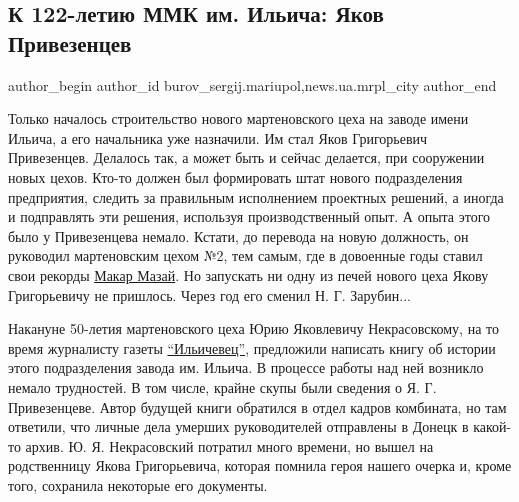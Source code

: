  
 
 
 
 
 
\subsection{К 122-летию ММК им. Ильича: Яков Привезенцев}
\label{sec:23_02_2019.stz.news.ua.mrpl_city.1.k_122_letiu_mmk_im_iljicha_jakov_privezencev}
 
\ifcmt
 author_begin
   author_id burov_sergij.mariupol,news.ua.mrpl_city
 author_end
\fi

Только началось строительство нового мартеновского цеха на заводе имени Ильича,
а его начальника уже назначили. Им стал Яков Григорьевич Привезенцев. Делалось
так, а может быть и сейчас делается, при сооружении новых цехов. Кто-то должен
был формировать штат нового подразделения предприятия, следить за правильным
исполнением проектных решений, а иногда и подправлять эти решения, используя
производственный опыт. А опыта этого было у Привезенцева немало. Кстати, до
перевода на новую должность, он руководил мартеновским цехом №2, тем самым, где
в довоенные годы ставил свои рекорды \href{https://archive.org/details/16_02_2019.sergij_burov.mrpl_city.k_122_letiu_mmk_im_iljicha_rekordy_makara_mazaja.}{Макар Мазай}. Но запускать ни одну из печей
нового цеха Якову Григорьевичу не пришлось. Через год его сменил Н. Г. Зарубин...

Накануне 50-летия мартеновского цеха Юрию Яковлевичу Некрасовскому, на то время
журналисту газеты
\href{https://mrpl.city/blogs/view/geroi-novyh-formatov}{\enquote{Ильичевец}},
предложили написать книгу об истории этого подразделения завода им. Ильича. В
процессе работы над ней возникло немало трудностей. В том числе, крайне скупы
были сведения о Я. Г. Привезенцеве. Автор будущей книги обратился в отдел
кадров комбината, но там ответили, что личные дела умерших руководителей
отправлены в Донецк в какой-то архив. Ю. Я.  Некрасовский потратил много
времени, но вышел на родственницу Якова Григорьевича, которая помнила героя
нашего очерка и, кроме того, сохранила некоторые его документы.


